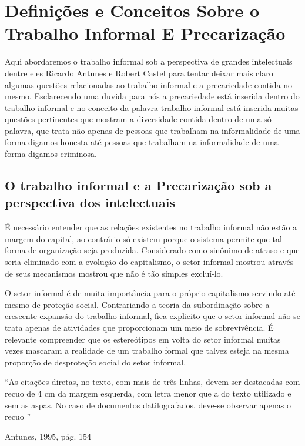 \chapter{Definições e Conceitos Sobre o Trabalho Informal E Precarização}

Aqui abordaremos o trabalho informal sob a perspectiva de grandes intelectuais dentre eles Ricardo Antunes 
e Robert Castel para tentar deixar mais claro algumas questões relacionadas ao trabalho informal e a 
precariedade contida no mesmo. Esclarecendo uma duvida para nós a precariedade está inserida dentro do 
trabalho informal e no conceito da palavra trabalho informal está inserida muitas questões pertinentes que 
mostram a diversidade contida dentro de uma só palavra, que trata não apenas de pessoas que trabalham na 
informalidade de uma forma digamos honesta até pessoas que trabalham na informalidade de uma forma digamos 
criminosa. 

\section{O trabalho informal e a Precarização sob a perspectiva dos intelectuais}

É necessário entender que as relações existentes no trabalho informal não estão a margem do capital, ao 
contrário só existem porque o sistema permite que tal forma de organização seja produzida. Considerado 
como sinônimo de atraso e que seria eliminado com a evolução do capitalismo, o setor informal mostrou 
através de seus mecanismos mostrou que não é tão simples excluí-lo. 

O setor informal é de muita importância para o próprio capitalismo servindo até mesmo de proteção social.
Contrariando a teoria da subordinação sobre a crescente expansão do trabalho informal, fica explicito 
que o setor informal não se trata apenas de atividades que proporcionam um meio de sobrevivência. É 
relevante compreender que os estereótipos em volta do setor informal muitas vezes mascaram a realidade 
de um trabalho formal que talvez esteja na mesma proporção de desproteção social do setor informal.

\begin{citacao}
``As citações diretas, no texto, com mais de três linhas, devem ser
destacadas com recuo de 4 cm da margem esquerda, com letra menor que
a do texto utilizado e sem as aspas. No caso de documentos datilografados,
deve-se observar apenas o recuo \cite[5.3]{NBR10520:2002}''

Antunes, 1995, pág. 154
\end{citacao}

